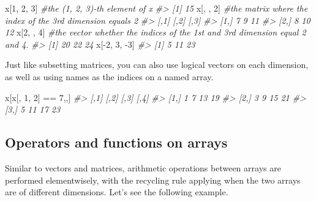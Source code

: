 \documentclass[
]{book}
\newenvironment{Shaded}{\begin{snugshade}}{\end{snugshade}}
\newcommand{\CommentTok}[1]{\textcolor[rgb]{0.56,0.35,0.01}{\textit{#1}}}
\newcommand{\DecValTok}[1]{\textcolor[rgb]{0.00,0.00,0.81}{#1}}
\newcommand{\NormalTok}[1]{#1}
\newcommand{\SpecialCharTok}[1]{\textcolor[rgb]{0.00,0.00,0.00}{#1}}
\begin{document}
\begin{Shaded}
\begin{Highlighting}[]
\NormalTok{x[}\DecValTok{1}\NormalTok{, }\DecValTok{2}\NormalTok{, }\DecValTok{3}\NormalTok{]     }\CommentTok{\#the (1, 2, 3){-}th element of x}
\CommentTok{\#\textgreater{} [1] 15}
\NormalTok{x[, , }\DecValTok{2}\NormalTok{]       }\CommentTok{\#the matrix where the index of the 3rd dimension equals 2}
\CommentTok{\#\textgreater{}      [,1] [,2] [,3]}
\CommentTok{\#\textgreater{} [1,]    7    9   11}
\CommentTok{\#\textgreater{} [2,]    8   10   12}
\NormalTok{x[}\DecValTok{2}\NormalTok{, , }\DecValTok{4}\NormalTok{]      }\CommentTok{\#the vector whether the indices of the 1st and 3rd dimension equal 2 and 4.}
\CommentTok{\#\textgreater{} [1] 20 22 24}
\NormalTok{x[}\SpecialCharTok{{-}}\DecValTok{2}\NormalTok{, }\DecValTok{3}\NormalTok{, }\SpecialCharTok{{-}}\DecValTok{3}\NormalTok{]   }
\CommentTok{\#\textgreater{} [1]  5 11 23}
\end{Highlighting}
\end{Shaded}

Just like subsetting matrices, you can also use logical vectors on each dimension, as well as using names as the indices on a named array.

\begin{Shaded}
\begin{Highlighting}[]
\NormalTok{x[x[, }\DecValTok{1}\NormalTok{, }\DecValTok{2}\NormalTok{] }\SpecialCharTok{==} \DecValTok{7}\NormalTok{,,]}
\CommentTok{\#\textgreater{}      [,1] [,2] [,3] [,4]}
\CommentTok{\#\textgreater{} [1,]    1    7   13   19}
\CommentTok{\#\textgreater{} [2,]    3    9   15   21}
\CommentTok{\#\textgreater{} [3,]    5   11   17   23}
\end{Highlighting}
\end{Shaded}

\hypertarget{operators-and-functions-on-arrays}{%
\subsection{Operators and functions on arrays}\label{operators-and-functions-on-arrays}}

Similar to vectors and matrices, arithmetic operations between arrays are performed elementwisely, with the recycling rule applying when the two arrays are of different dimensions. Let's see the following example.
\end{document}
